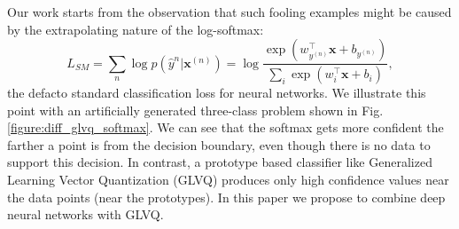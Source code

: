 \documentclass{esannV2}
\begin{document}
Our work starts from the observation that such fooling examples might be caused by the extrapolating nature of the log-softmax:
\begin{equation}
L_{SM} = \sum_n \log p(\hat{y}^{n}| \mathbf{x}^{(n)}) = \log \frac{\exp(w_{y^{(n)}}^\top \mathbf{x} + b_{y^{(n)}})}{\sum_i \exp(w_i^\top \mathbf{x} + b_i)},
\end{equation}
the defacto standard classification loss for neural networks. 
We illustrate this point with an artificially generated three-class problem shown in Fig. \ref{figure:diff_glvq_softmax}. We can see that the softmax gets more confident the farther a point is from the decision boundary, even though there is no data to support this decision. In contrast, a prototype based classifier like Generalized Learning Vector Quantization (GLVQ) \cite{sato1996generalized} produces only high confidence values near the data points (near the prototypes). In this paper we propose to combine deep neural networks with GLVQ. 
\end{document}
